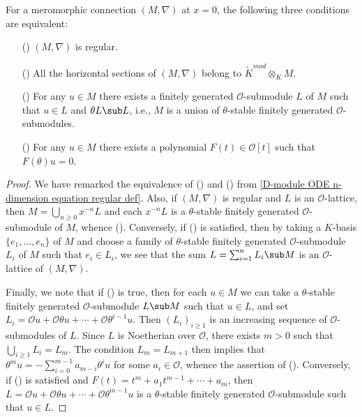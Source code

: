 \begin{proposition}\label{D-module mero conn over C regular iff}
For a meromorphic connection $(M,\nabla)$ at $x=0$, the following three conditions are equivalent:
\begin{enumerate}
    \item[(\rmnum{1})] $(M,\nabla)$ is regular.
    \item[(\rmnum{2})] All the horizontal sections of $(M,\nabla)$ belong to $\widetilde{K}^{mod}\otimes_KM$.
    \item[(\rmnum{3})] For any $u\in M$ there exists a finitely generated $\mathscr{O}$-submodule $L$ of $M$ such that $u\in L$ and $\theta L\sub L$, i.e., $M$ is a union of $\theta$-stable finitely generated $\mathscr{O}$-submodules.
    \item[(\rmnum{4})] For any $u\in M$ there exists a polynomial $F(t)\in\mathscr{O}[t]$ such that $F(\theta)u=0$.
\end{enumerate}
\end{proposition}
\begin{proof}
We have remarked the equivalence of () and () from \cref{D-module ODE n-dimension equation regular def}. Also, if $(M,\nabla)$ is regular and $L$ is an $\mathscr{O}$-lattice, then $M=\bigcup_{n\geq 0}x^{-n}L$ and each $x^{-n}L$ is a $\theta$-stable finitely generated $\mathscr{O}$-submodule of $M$, whence (). Conversely, if () is satisfied, then by taking a $K$-basis $\{e_1,\dots,e_n\}$ of $M$ and choose a family of $\theta$-stable finitely generated $\mathscr{O}$-submodule $L_i$ of $M$ such that $e_i\in L_i$, we see that the sum $L=\sum_{i=1}^{n}L_i\sub M$ is an $\mathscr{O}$-lattice of $(M,\nabla)$.\par
Finally, we note that if () is true, then for each $u\in M$ we can take a $\theta$-stable finitely generated $\mathscr{O}$-submodule $L\sub M$ such that $u\in L$, and set $L_i=\mathscr{O}u+\mathscr{O}\theta u+\cdots+\mathscr{O}\theta^{i-1}u$. Then $(L_i)_{i\geq 1}$ is an increasing sequence of $\mathscr{O}$-submodules of $L$. Since $L$ is Noetherian over $\mathscr{O}$, there exists $m>0$ such that $\bigcup_{i\geq 1}L_i=L_m$. The condition $L_m=L_{m+1}$ then implies that $\theta^mu=-\sum_{i=0}^{m-1}a_{m-i}\theta^iu$ for some $a_i\in\mathscr{O}$, whence the assertion of (). Conversely, if () is satisfied and $F(t)=t^m+a_1t^{m-1}+\cdots+a_m$, then $L=\mathscr{O}u+\mathscr{O}\theta u+\cdots+\mathscr{O}\theta^{m-1}u$ is a $\theta$-stable finitely generated $\mathscr{O}$-submodule such that $u\in L$.
\end{proof}

